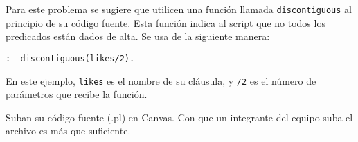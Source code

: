 \documentclass[]{book}
\theoremstyle{definition}
\begin{document}
Para este problema se sugiere que utilicen una función llamada \texttt{discontiguous} al principio de su código fuente.
Esta función indica al script que no todos los predicados están dados de alta. Se usa de la siguiente manera:

\begin{tcolorbox}
    \texttt{:- discontiguous(likes/2).}
\end{tcolorbox}

En este ejemplo, \texttt{likes} es el nombre de su cláusula, y \texttt{/2} es el número de parámetros que recibe la función.

\vspace{7ex}

Suban su código fuente (.pl) en Canvas. Con que un integrante del equipo suba el archivo es más que suficiente.
\end{document}
